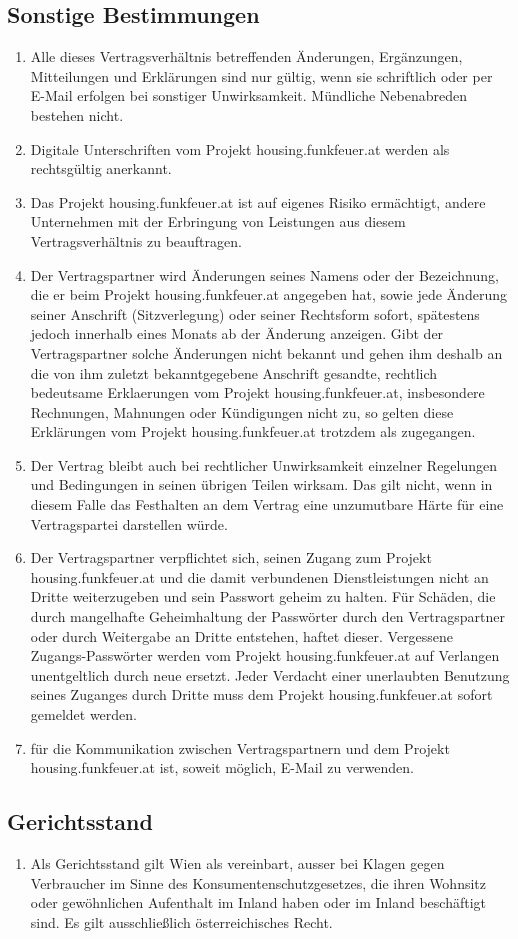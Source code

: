 \documentclass[parskip=half]{article}
\begin{document}
\subsection{ Sonstige Bestimmungen}
\begin{enumerate}
\item Alle dieses Vertragsverhältnis betreffenden Änderungen, Ergänzungen, Mitteilungen
und Erklärungen sind nur gültig, wenn sie schriftlich oder per E-Mail erfolgen bei
sonstiger Unwirksamkeit. Mündliche Nebenabreden bestehen nicht.
\item Digitale Unterschriften vom Projekt housing.funkfeuer.at werden als rechtsgültig
anerkannt.
\item Das Projekt housing.funkfeuer.at ist auf eigenes Risiko ermächtigt, andere
Unternehmen mit der Erbringung von Leistungen aus diesem Vertragsverhältnis zu
beauftragen.
\item Der Vertragspartner wird Änderungen seines Namens oder der Bezeichnung, die er
beim Projekt housing.funkfeuer.at angegeben hat, sowie jede Änderung seiner Anschrift
(Sitzverlegung) oder seiner Rechtsform sofort, spätestens jedoch innerhalb eines Monats
ab der Änderung anzeigen. Gibt der Vertragspartner solche Änderungen nicht bekannt
und gehen ihm deshalb an die von ihm zuletzt bekanntgegebene Anschrift gesandte,
rechtlich bedeutsame Erklaerungen vom Projekt housing.funkfeuer.at, insbesondere
Rechnungen, Mahnungen oder Kündigungen nicht zu, so gelten diese Erklärungen vom
Projekt housing.funkfeuer.at trotzdem als zugegangen.
\item Der Vertrag bleibt auch bei rechtlicher Unwirksamkeit einzelner Regelungen und
Bedingungen in seinen übrigen Teilen wirksam. Das gilt nicht, wenn in diesem Falle das
Festhalten an dem Vertrag eine unzumutbare Härte für eine Vertragspartei darstellen
würde.
\item Der Vertragspartner verpflichtet sich, seinen Zugang zum Projekt housing.funkfeuer.at
und die damit verbundenen Dienstleistungen nicht an Dritte weiterzugeben und sein
Passwort geheim zu halten. Für Schäden, die durch mangelhafte Geheimhaltung der
Passwörter durch den Vertragspartner oder durch Weitergabe an Dritte entstehen, haftet
dieser. Vergessene Zugangs-Passwörter werden vom Projekt housing.funkfeuer.at auf
Verlangen unentgeltlich durch neue ersetzt. Jeder Verdacht einer unerlaubten Benutzung
seines Zuganges durch Dritte muss dem Projekt housing.funkfeuer.at sofort gemeldet
werden.
\item für die Kommunikation zwischen Vertragspartnern und dem Projekt housing.funkfeuer.at ist,
soweit möglich, E-Mail zu verwenden.
\end{enumerate}

\subsection{ Gerichtsstand}
\begin{enumerate}
\item Als Gerichtsstand gilt Wien als vereinbart, ausser bei Klagen gegen Verbraucher im Sinne
des Konsumentenschutzgesetzes, die ihren Wohnsitz oder gewöhnlichen Aufenthalt im
Inland haben oder im Inland beschäftigt sind. Es gilt ausschließlich österreichisches Recht.
\end{enumerate}
\end{document}

